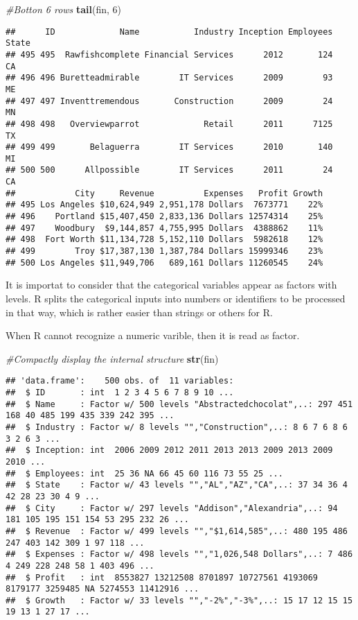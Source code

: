 \documentclass[]{article}
\newenvironment{Shaded}{\begin{snugshade}}{\end{snugshade}}
\newcommand{\CommentTok}[1]{\textcolor[rgb]{0.56,0.35,0.01}{\textit{#1}}}
\newcommand{\DecValTok}[1]{\textcolor[rgb]{0.00,0.00,0.81}{#1}}
\newcommand{\KeywordTok}[1]{\textcolor[rgb]{0.13,0.29,0.53}{\textbf{#1}}}
\newcommand{\NormalTok}[1]{#1}
\begin{document}
\begin{Shaded}
\begin{Highlighting}[]
\CommentTok{#Botton 6 rows}
\KeywordTok{tail}\NormalTok{(fin, }\DecValTok{6}\NormalTok{)}
\end{Highlighting}
\end{Shaded}

\begin{verbatim}
##      ID             Name           Industry Inception Employees State
## 495 495  Rawfishcomplete Financial Services      2012       124    CA
## 496 496 Buretteadmirable        IT Services      2009        93    ME
## 497 497 Inventtremendous       Construction      2009        24    MN
## 498 498   Overviewparrot             Retail      2011      7125    TX
## 499 499       Belaguerra        IT Services      2010       140    MI
## 500 500      Allpossible        IT Services      2011        24    CA
##            City     Revenue          Expenses   Profit Growth
## 495 Los Angeles $10,624,949 2,951,178 Dollars  7673771    22%
## 496    Portland $15,407,450 2,833,136 Dollars 12574314    25%
## 497    Woodbury  $9,144,857 4,755,995 Dollars  4388862    11%
## 498  Fort Worth $11,134,728 5,152,110 Dollars  5982618    12%
## 499        Troy $17,387,130 1,387,784 Dollars 15999346    23%
## 500 Los Angeles $11,949,706   689,161 Dollars 11260545    24%
\end{verbatim}

It is importat to consider that the categorical variables appear as
factors with levels. R splits the categorical inputs into numbers or
identifiers to be processed in that way, which is rather easier than
strings or others for R.

When R cannot recognize a numeric varible, then it is read as factor.

\begin{Shaded}
\begin{Highlighting}[]
\CommentTok{#Compactly display the internal structure}
\KeywordTok{str}\NormalTok{(fin)}
\end{Highlighting}
\end{Shaded}

\begin{verbatim}
## 'data.frame':    500 obs. of  11 variables:
##  $ ID       : int  1 2 3 4 5 6 7 8 9 10 ...
##  $ Name     : Factor w/ 500 levels "Abstractedchocolat",..: 297 451 168 40 485 199 435 339 242 395 ...
##  $ Industry : Factor w/ 8 levels "","Construction",..: 8 6 7 6 8 6 3 2 6 3 ...
##  $ Inception: int  2006 2009 2012 2011 2013 2013 2009 2013 2009 2010 ...
##  $ Employees: int  25 36 NA 66 45 60 116 73 55 25 ...
##  $ State    : Factor w/ 43 levels "","AL","AZ","CA",..: 37 34 36 4 42 28 23 30 4 9 ...
##  $ City     : Factor w/ 297 levels "Addison","Alexandria",..: 94 181 105 195 151 154 53 295 232 26 ...
##  $ Revenue  : Factor w/ 499 levels "","$1,614,585",..: 480 195 486 247 403 142 309 1 97 118 ...
##  $ Expenses : Factor w/ 498 levels "","1,026,548 Dollars",..: 7 486 4 249 228 248 58 1 403 496 ...
##  $ Profit   : int  8553827 13212508 8701897 10727561 4193069 8179177 3259485 NA 5274553 11412916 ...
##  $ Growth   : Factor w/ 33 levels "","-2%","-3%",..: 15 17 12 15 15 19 13 1 27 17 ...
\end{verbatim}
\end{document}
